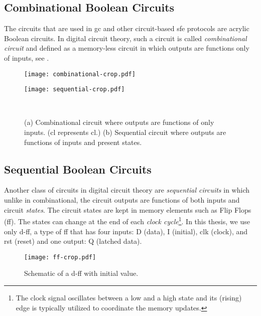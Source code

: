 \subsection{Combinational Boolean Circuits}\label{ssec:prelim-comb}
The circuits that are used in \acrshort{gc} and other circuit-based \acrshort{sfe} protocols are acrylic Boolean circuits.
In digital circuit theory, such a circuit is called \emph{combinational circuit} and defined as a memory-less circuit in which outputs are functions only of inputs, see .

\begin{figure}
    \centering
    \begin{minipage}[t]{0.4\textwidth}
        \texttt{[image: combinational-crop.pdf]}
        \label{fig:combinational}
    \end{minipage}
    \begin{minipage}[t]{0.45\textwidth}
        \texttt{[image: sequential-crop.pdf]}
        \label{fig:sequential}
    \end{minipage}\\
    \caption{(a) Combinational circuit where outputs are functions of only inputs. (\acrfull{cl} represents \acrlong{cl}.)
    (b) Sequential circuit where outputs are functions of inputs and present states.
    }\label{fig:combinational-sequential}
\end{figure}

\subsection{Sequential Boolean Circuits}\label{ssec:prelim-seq}
Another class of circuits in digital circuit theory are \emph{sequential circuits} in which unlike in combinational, the circuit outputs are functions of both inputs and circuit \emph{states}.
The circuit states are kept in memory elements such as Flip Flops (\acrshort{ff}).
The states can change at the end of each \emph{clock cycle}\footnote{The clock signal oscillates between a low and a high state and its (rising) edge is typically utilized to coordinate the memory updates.}.
In this thesis, we use only \acrfull{d-ff}, a type of \acrshort{ff} that has four inputs: D (data), I (initial), clk (clock), and rst (reset) and one output: Q (latched data).

\begin{figure}
    \centering
	\texttt{[image: ff-crop.pdf]}
	\caption{Schematic of a \acrshort{d-ff} with initial value.}
	\label{fig:ff}
\end{figure}

